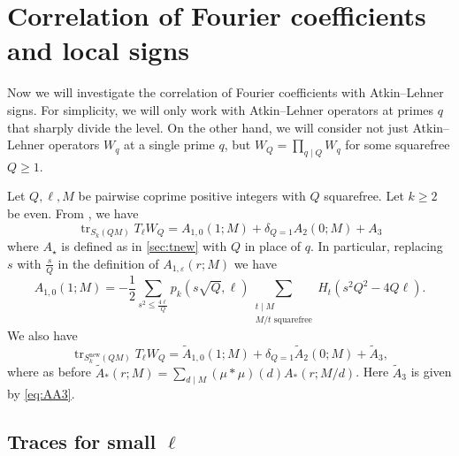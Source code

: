 \documentclass[11pt]{amsart}
\newcommand{\eps}{\varepsilon}
\newcommand{\new}{\mathrm{new}}
\renewcommand{\mod}{\bmod}
\DeclareMathOperator{\tr}{tr}
\numberwithin{lem}{section}
\newtheorem{prop}[lem]{Proposition}
\theoremstyle{remark}
\theoremstyle{definition}
\numberwithin{equation}{section}
\begin{document}



\section{Correlation of Fourier coefficients and local signs} \label{sec:trl}


Now we will investigate the correlation of Fourier coefficients with Atkin--Lehner signs.  For simplicity, we will only work with Atkin--Lehner operators at primes $q$ that sharply divide the level.  On the other hand, we will consider not just Atkin--Lehner operators $W_q$ at a single prime $q$, but $W_Q = \prod_{q \mid Q} W_q$ for some squarefree $Q \ge 1$.

Let $Q, \ell, M$ be pairwise coprime positive integers with $Q$ squarefree.  Let $k \ge 2$ be even.  From \cite{SZ}, we have
\[ \tr_{S_k(QM)} T_\ell W_Q = A_{1,0}(1; M) + \delta_{Q=1} A_2(0; M) + A_3 \]
where $A_\star$ is defined as in \cref{sec:tnew} with $Q$ in place of $q$. In particular, replacing $s$ with $\frac sQ$ in the definition of $A_{1,\eps}(r;M)$ we have
\[ A_{1,0}(1; M) = - \frac 12 \sum_{s^2 \le \frac{4 \ell}Q} p_k(s \sqrt Q, \ell)
\sum_{\substack{t \mid M \\ M/t \text{ squarefree}}} H_t(s^2 Q^2 - 4 Q \ell). \]
 We also have
\begin{equation} \label{eq:tnewQM}
\tr_{S^\new_k(QM)} T_\ell W_Q = \tilde A_{1,0}(1; M) + \delta_{Q=1} \tilde A_2(0; M) + \tilde A_3,
\end{equation}
where as before $\tilde A_*(r; M) = \sum_{d \mid M} (\mu * \mu)(d) A_*(r; M/d)$.  Here $\tilde A_3$ is given by \eqref{eq:AA3}.  

\subsection{Traces for small $\ell$} \label{sec:trlsmall}
\end{document}
